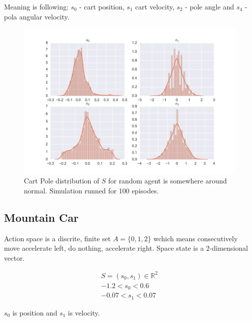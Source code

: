 \documentclass[12pt]{article}
\begin{document}
Meaning is following: $s_0$ - cart position, $s_1$ cart velocity, $s_2$ - pole angle and $s_4$ - pola angular velocity.

\begin{figure}[h]
\includegraphics[width=\textwidth]{exploratory_cartpole.png} 
\centering
\caption{Cart Pole distribution of $S$ for random agent is somewhere around normal. Simulation runned for 100 episodes.}
\end{figure}

\subsection{Mountain Car}
Action space is a discrite, finite set $A = \{0,1,2\}$ wchich means consecutively move accelerate left, do nothing, accelerate right. Space state is a 2-dimensional vector.

\begin{multline*}
 S = (s_0, s_1) \in \mathbb{R}^2 \\
-1.2 < s_0 < 0.6 \\
-0.07 < s_1 < 0.07
\end{multline*}

$s_0$ is position and $s_1$ is velocity.
\end{document}
